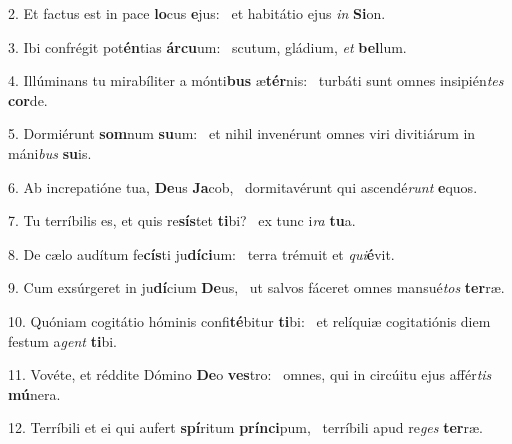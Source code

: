 2. Et factus est in pace \textbf{lo}cus \textbf{e}jus: \ast\  et habitátio ejus \textit{in} \textbf{Si}on.\

3. Ibi confrégit pot\textbf{én}tias \textbf{ár}\textbf{cu}um: \ast\  scutum, gládium, \textit{et} \textbf{bel}lum.\

4. Illúminans tu mirabíliter a mónti\textbf{bus} æ\textbf{tér}nis: \ast\  turbáti sunt omnes insipién\textit{tes} \textbf{cor}de.\

5. Dormiérunt \textbf{som}num \textbf{su}um: \ast\  et nihil invenérunt omnes viri divitiárum in máni\textit{bus} \textbf{su}is.\

6. Ab increpatióne tua, \textbf{De}us \textbf{Ja}cob, \ast\  dormitavérunt qui ascendé\textit{runt} \textbf{e}quos.\

7. Tu terríbilis es, et quis re\textbf{sís}tet \textbf{ti}bi? \ast\  ex tunc i\textit{ra} \textbf{tu}a.\

8. De cælo audítum fe\textbf{cís}ti ju\textbf{dí}\textbf{ci}um: \ast\  terra trémuit et \textit{qui}\textbf{é}vit.\

9. Cum exsúrgeret in ju\textbf{dí}cium \textbf{De}us, \ast\  ut salvos fáceret omnes mansué\textit{tos} \textbf{ter}ræ.\

10. Quóniam cogitátio hóminis confi\textbf{té}bitur \textbf{ti}bi: \ast\  et relíquiæ cogitatiónis diem festum a\textit{gent} \textbf{ti}bi.\

11. Vovéte, et réddite Dómino \textbf{De}o \textbf{ves}tro: \ast\  omnes, qui in circúitu ejus affér\textit{tis} \textbf{mú}nera.\

12. Terríbili et ei qui aufert \textbf{spí}ritum \textbf{prín}\textbf{ci}pum, \ast\  terríbili apud re\textit{ges} \textbf{ter}ræ.\

